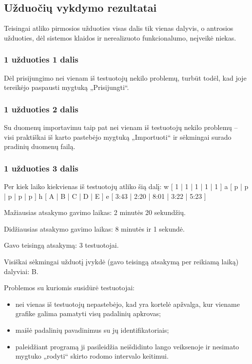 \subsection{Užduočių vykdymo rezultatai}

Teisingai atliko pirmosios užduoties visas dalis tik vienas dalyvis,
o antrosios užduoties, dėl sistemos klaidos ir nerealizuoto
funkcionalumo, neįveikė niekas.

\subsubsection{1 užduoties 1 dalis}

Dėl prisijungimo nei vienam iš testuotojų nekilo problemų, turbūt todėl,
kad joje tereikėjo paspausti mygtuką „Prisijungti“.

\subsubsection{1 užduoties 2 dalis}

Su duomenų importavimu taip pat nei vienam iš testuotojų nekilo problemų
– visi praktiškai iš karto pastebėjo mygtuką „Importuoti“ ir sėkmingai
surado pradinių duomenų failą.

\subsubsection{1 užduoties 3 dalis}

Per kiek laiko kiekvienas iš testuotojų atliko šią dalį:
\xtable
{
  w [ 1 | 1 | 1 | 1 | 1 ]
  a [ p | p | p | p | p ]
  h [ A | B | C | D | E ]
  e [ 3:43 | 2:20 | 8:01 | 3:22 | 5:23 ]
}

Mažiausias atsakymo gavimo laikas: 2 minutės 20 sekundžių.

Didžiausias atsakymo gavimo laikas: 8 minutės ir 1 sekundė.

Gavo teisingą atsakymą: 3 testuotojai.

Visiškai sėkmingai užduotį įvykdė (gavo teisingą atsakymą per reikiamą 
laiką) dalyviai: B.

Problemos su kuriomis susidūrė testuotojai:
\begin{itemize}
  \item nei vienas iš testuotojų nepastebėjo, kad yra kortelė apžvalga,
    kur viename grafike galima pamatyti visų padalinių apkrovas;
  \item maišė padalinių pavadinimus su jų identifikatoriais;
  \item paleidžiant programą ji pasileidžia neišdidinto lango veiksenoje
    ir nesimato mygtuko „rodyti“ skirto rodomo intervalo keitimui.
\end{itemize}

